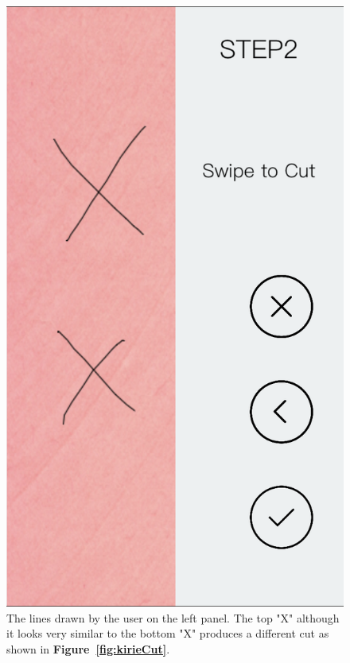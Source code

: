 \documentclass[11pt]{article}
\begin{document}
                \begin{figure}[!ht]
                        \begin{minipage}{0.45\textwidth}
                            \centering \includegraphics[width=0.7\linewidth]{Images/kirieXs.png}
                            \caption{The lines drawn by the user on the left panel. The top "X" although it looks very similar to the bottom "X" produces a different cut as shown in  \textbf{Figure~\ref{fig:kirieCut}}.\\\\}
                            \label{fig:kirieXs}
                        \end{minipage}\hfill
                        \begin{minipage}{0.45\textwidth}
                            \centering

\end{minipage}
\end{figure}
\end{document}
